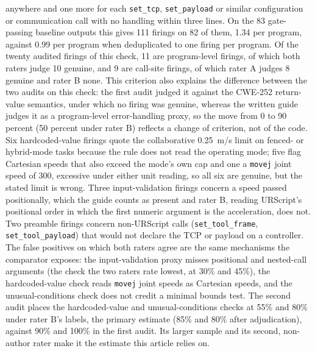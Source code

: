 \documentclass{ieeeaccess}
\begin{document}
anywhere and one more for each \texttt{set\_tcp}, \texttt{set\_payload} or similar
configuration or communication call with no handling within three lines. On the 83
gate-passing baseline outputs this gives 111 firings on 82 of them, 1.34 per program,
against 0.99 per program when deduplicated to one firing per program. Of the twenty
audited firings of this check, 11 are program-level firings, of which both raters judge
10 genuine, and 9 are call-site firings, of which rater A judges 8 genuine and rater B
none. This criterion also
explains the difference between the two audits on this check: the first audit judged
it against the CWE-252 return-value semantics, under which no firing was genuine,
whereas the written guide judges it as a program-level error-handling proxy, so the
move from 0 to 90 percent (50 percent under rater B) reflects a change of criterion,
not of the code. Six hardcoded-value
firings quote the collaborative 0.25~m/s limit on fenced- or hybrid-mode tasks because
the rule does not read the operating mode; five flag Cartesian speeds that also exceed the
mode's own cap and one a \texttt{movej} joint speed of 300, excessive under either unit
reading, so all six are genuine, but the stated limit is wrong. Three input-validation
firings concern a speed passed positionally, which the guide counts as present and rater
B, reading URScript's positional order in which the first numeric argument is the
acceleration, does not. Two preamble firings concern non-URScript calls
(\texttt{set\_tool\_frame}, \texttt{set\_tool\_payload}) that would not declare the TCP
or payload on a controller. The false positives on which both raters agree are the same
mechanisms the comparator exposes: the input-validation proxy misses positional and
nested-call arguments (the check the two raters rate lowest, at 30\% and 45\%), the
hardcoded-value check reads \texttt{movej} joint speeds as Cartesian speeds, and the
unusual-conditions check does not credit a minimal bounds test. The second audit places
the hardcoded-value and unusual-conditions checks at 55\% and 80\% under rater B's labels, the
primary estimate (85\% and 80\% after adjudication), against 90\% and 100\% in the first
audit. Its larger sample
and its second, non-author rater make it the estimate this article relies on.
\end{document}
